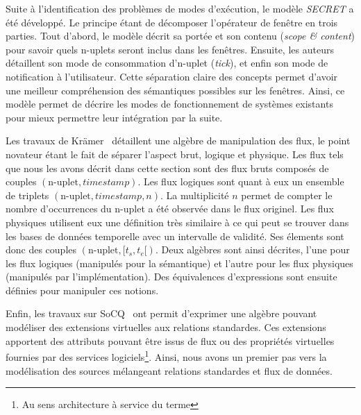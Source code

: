 Suite à l'identification des problèmes de modes d'exécution, le modèle \textit{SECRET} a été développé. Le principe étant de décomposer l'opérateur de fenêtre en trois parties. Tout d'abord, le modèle décrit sa portée et son contenu (\textit{scope \& content}) pour savoir quels n-uplets seront inclus dans les fenêtres. Ensuite, les auteurs détaillent son mode de consommation d'n-uplet (\textit{tick}), et enfin son mode de notification à l'utilisateur. Cette séparation claire des concepts permet d'avoir une meilleur compréhension des sémantiques possibles sur les fenêtres. Ainsi, ce modèle permet de décrire les modes de fonctionnement de systèmes existants pour mieux permettre leur intégration par la suite.

Les travaux de Krämer~\cite{Kramer:semantics} détaillent une algèbre de manipulation des flux, le point novateur étant le fait de séparer l'aspect brut, logique et physique. Les flux tels que nous les avons décrit dans cette section sont des flux bruts composés de couples $(\textrm{n-uplet},\textit{timestamp})$. Les flux logiques sont quant à eux un ensemble de triplets $(\textrm{n-uplet}, \textit{timestamp}, n)$. La multiplicité $n$ permet de compter le nombre d'occurrences du n-uplet a été observée dans le flux originel. Les flux physiques utilisent eux une définition très similaire à ce qui peut se trouver dans les bases de données temporelle avec un intervalle de validité. Ses élements sont donc des couples $(\textrm{n-uplet},[t_s, t_e[)$. Deux algèbres sont ainsi décrites, l'une pour les flux logiques (manipulés pour la sémantique) et l'autre pour les flux physiques (manipulés par l'implémentation). Des équivalences d'expressions sont ensuite définies pour manipuler ces notions.

Enfin, les travaux sur SoCQ~\cite{Gripay:algebra} ont permit d'exprimer une algèbre pouvant modéliser des extensions virtuelles aux relations standardes. Ces extensions apportent des attributs pouvant être issus de flux ou des propriétés virtuelles fournies par des services logiciels\footnote{Au sens architecture à service du terme}. Ainsi, nous avons un premier pas vers la modélisation des sources mélangeant relations standardes et flux de données.

